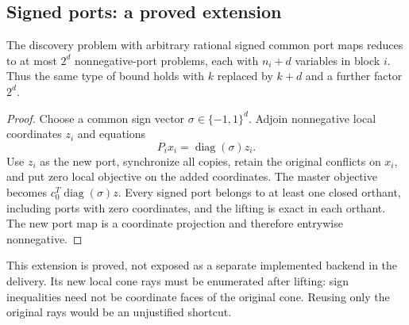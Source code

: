 \subsection{Signed ports: a proved extension}
\begin{corollary}
\label{cor:signed}
The discovery problem with arbitrary rational signed common port maps reduces to at most $2^d$ nonnegative-port problems, each with $n_i+d$ variables in block $i$. Thus the same type of bound holds with $k$ replaced by $k+d$ and a further factor $2^d$.
\end{corollary}
\begin{proof}
Choose a common sign vector $\sigma\in\{-1,1\}^d$. Adjoin nonnegative local coordinates $z_i$ and equations
\[
 P_i x_i=\operatorname{diag}(\sigma)z_i.
\]
Use $z_i$ as the new port, synchronize all copies, retain the original conflicts on $x_i$, and put zero local objective on the added coordinates. The master objective becomes $c_0^T\operatorname{diag}(\sigma)z$. Every signed port belongs to at least one closed orthant, including ports with zero coordinates, and the lifting is exact in each orthant. The new port map is a coordinate projection and therefore entrywise nonnegative.
\end{proof}

This extension is proved, not exposed as a separate implemented backend in the delivery. Its new local cone rays must be enumerated after lifting: sign inequalities need not be coordinate faces of the original cone. Reusing only the original rays would be an unjustified shortcut.
